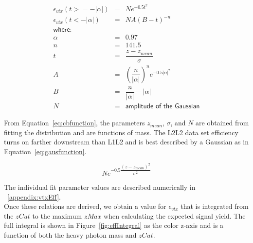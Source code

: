\begin{eqnarray*}
\label{eq:cbfunction}
\epsilon_{vtx}(t >= -| \alpha |) & = & N e^{-0.5t^{2}}\\
\epsilon_{vtx}(t < -| \alpha |) & = & N A(B-t)^{-n}\\
\textsf{where:}\\
\alpha & = & 0.97\\
n & = & 141.5\\
t & = & \dfrac{z-z_{mean}}{\sigma}\\
A & = & (\dfrac{n}{| \alpha |})^{n}e^{-0.5 |\alpha |^2}\\
B & = & \dfrac{n}{| \alpha |}-|\alpha | \\
N & = & \textsf{amplitude of the Gaussian}
\end{eqnarray*}

From Equation~\eqref{eq:cbfunction}, the parameters $z_{mean}$, $\sigma$, and $N$ are obtained from fitting the distribution and are functions of mass. The L2L2 data set efficiency turns on farther downstream than L1L2 and is best described by a Gaussian as in Equation~\eqref{eq:gausfunction}.

\begin{equation}
\label{eq:gausfunction}
Ne^{-0.5\dfrac{(z-z_{mean})^2}{\sigma^2}}
\end{equation}

The individual fit parameter values are described numerically in ~\ref{appendix:vtxEff}.\\
\indent Once these relations are derived, we obtain a value for $\epsilon_{vtx}$ that is integrated from the $zCut$ to the maximum $zMax$ when calculating the expected signal yield. The full integral is shown in Figure~\ref{fig:effIntegral} as the color z-axis and is a function of both the heavy photon mass and $zCut$.  

